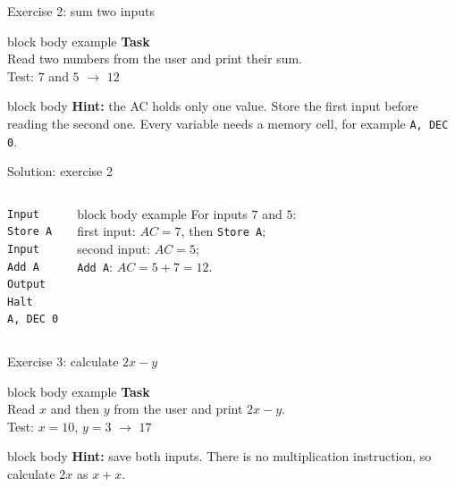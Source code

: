 \documentclass[aspectratio=169,10pt]{beamer}
\begin{document}
\begin{frame}{Exercise 2: sum two inputs}
  \begin{beamercolorbox}[rounded=true,sep=0.14cm,wd=0.68\textwidth]{block body example}
    \small\textbf{Task}\\[0.08cm]
    \footnotesize Read two numbers from the user and print their sum.\\[0.08cm]
    \scriptsize Test: $7$ and $5$ $\to$ $12$
  \end{beamercolorbox}
  \vspace{0.12cm}
  \begin{beamercolorbox}[rounded=true,sep=0.12cm,wd=0.68\textwidth]{block body}
    \footnotesize
    \textbf{Hint:} the AC holds only one value. Store the first input before reading the second one.
    Every variable needs a memory cell, for example \texttt{A, DEC 0}.
  \end{beamercolorbox}
\end{frame}

\begin{frame}[fragile]{Solution: exercise 2}
  \begin{columns}[T,onlytextwidth]
\begin{lstlisting}[style=marie]
Input
Store A
Input
Add A
Output
Halt
A, DEC 0
\end{lstlisting}
      \begin{beamercolorbox}[rounded=true,sep=0.12cm,wd=\linewidth]{block body example}
        \footnotesize
        For inputs $7$ and $5$:\\[0.04cm]
        first input: $AC=7$, then \texttt{Store A};\\
        second input: $AC=5$;\\
        \texttt{Add A}: $AC=5+7=12$.
      \end{beamercolorbox}
  \end{columns}
\end{frame}

\begin{frame}{Exercise 3: calculate $2x-y$}
  \begin{beamercolorbox}[rounded=true,sep=0.14cm,wd=0.68\textwidth]{block body example}
    \small\textbf{Task}\\[0.08cm]
    \footnotesize Read $x$ and then $y$ from the user and print $2x-y$.\\[0.08cm]
    \scriptsize Test: $x=10$, $y=3$ $\to$ $17$
  \end{beamercolorbox}
  \vspace{0.12cm}
  \begin{beamercolorbox}[rounded=true,sep=0.12cm,wd=0.68\textwidth]{block body}
    \footnotesize
    \textbf{Hint:} save both inputs. There is no multiplication instruction, so calculate $2x$ as $x+x$.
  \end{beamercolorbox}
\end{frame}
\end{document}
